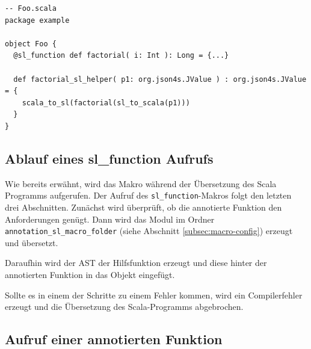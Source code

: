 \documentclass[12pt,bibtotoc]{scrreprt}
\begin{document}
\begin{lstlisting}[caption=Hilfsfunktion zur Funktion aus Listing \ref{lst:example-function}, label=lst:helperfunction, float=h]
-- Foo.scala
package example

object Foo {
  @sl_function def factorial( i: Int ): Long = {...}
  
  def factorial_sl_helper( p1: org.json4s.JValue ) : org.json4s.JValue = {
    scala_to_sl(factorial(sl_to_scala(p1)))
  }
}
\end{lstlisting}

\subsection{Ablauf eines sl\_function Aufrufs}

Wie bereits erwähnt, wird das Makro während der Übersetzung des Scala Programms aufgerufen. Der Aufruf des \lstinline!sl_function!-Makros folgt den letzten drei Abschnitten. Zunächst wird überprüft, ob die annotierte Funktion den Anforderungen genügt. Dann wird das Modul im Ordner \lstinline!annotation_sl_macro_folder! (siehe Abschnitt \ref{subsec:macro-config}) erzeugt und übersetzt.

Daraufhin wird der \ac{AST} der Hilfsfunktion erzeugt und diese hinter der annotierten Funktion in das Objekt eingefügt. 

Sollte es in einem der Schritte zu einem Fehler kommen, wird ein Compilerfehler erzeugt und die Übersetzung des Scala-Programms abgebrochen.

\subsection{Aufruf einer annotierten Funktion}
\label{subs:call-scala-functions}
\end{document}
